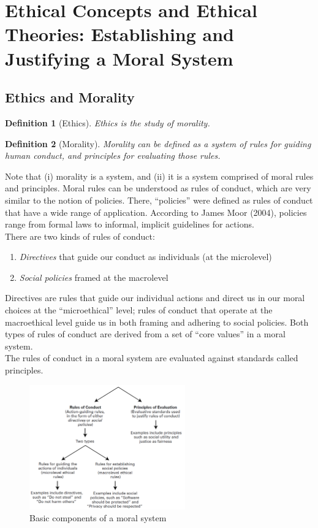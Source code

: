 \documentclass[12pt]{article}
\newtheorem{definition}{Definition}[section]
\theoremstyle{definition}
\begin{document}
\section{Ethical Concepts and Ethical Theories: Establishing and Justifying a Moral System}
\subsection{Ethics and Morality}
\begin{definition}[Ethics]\normalfont Ethics is the study of morality.
\end{definition}
\begin{definition}[Morality]\normalfont Morality can be defined as a system of rules for guiding human
conduct, and principles for evaluating those rules.
\end{definition}
Note that (i) morality is a system, and (ii) it is a system comprised of moral rules and principles. Moral rules can be understood as rules of conduct, which are very similar to the notion of policies. There, “policies” were defined as rules of conduct that have a wide range of application. According to James Moor (2004), policies range from formal laws to informal, implicit guidelines for actions.\\
There are two kinds of rules of conduct:
\begin{enumerate}
\item \textit{Directives} that guide our conduct as individuals (at the microlevel)
\item \textit{Social policies} framed at the macrolevel
\end{enumerate}
Directives are rules that guide our individual actions and direct us in our moral choices at the “microethical” level; rules of conduct that operate at the macroethical level guide us in both framing and adhering to social policies. Both types of rules of conduct are derived from a set of “core values” in a moral system. \\
The rules of conduct in a moral system are evaluated against standards called principles.
\begin{figure}[h]
\centering
\includegraphics[width=0.6\textwidth]{1.png}
\caption{Basic components of a moral system}
\end{figure}
\end{document}
